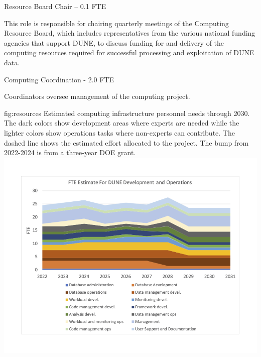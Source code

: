 \documentclass[../main-v1.tex]{subfiles}
\begin{document}
\begin{description}
\item {Resource Board Chair -- 0.1 FTE}

This role is responsible for chairing quarterly meetings of the Computing Resource Board, which includes representatives from the %
various national funding agencies that support DUNE, to discuss %
funding for and delivery of the computing resources required for successful processing and exploitation of DUNE data. %

\item {Computing Coordination - 2.0 FTE}

Coordinators oversee management of the computing project. 
\end{description}



\begin{dunefigure}
{fig:resources}
{Estimated computing infrastructure personnel needs through 2030.  The dark colors show development areas where experts are needed while the lighter colors show operations tasks where non-experts can contribute. The dashed line shows the estimated effort allocated to the project.  The bump from 2022-2024 is from a three-year DOE grant.}
{\includegraphics[width=0.9 \textwidth]{graphics/Resources/FTENeeds-2022-02-redo.png}}
\end{dunefigure}



\end{document}
